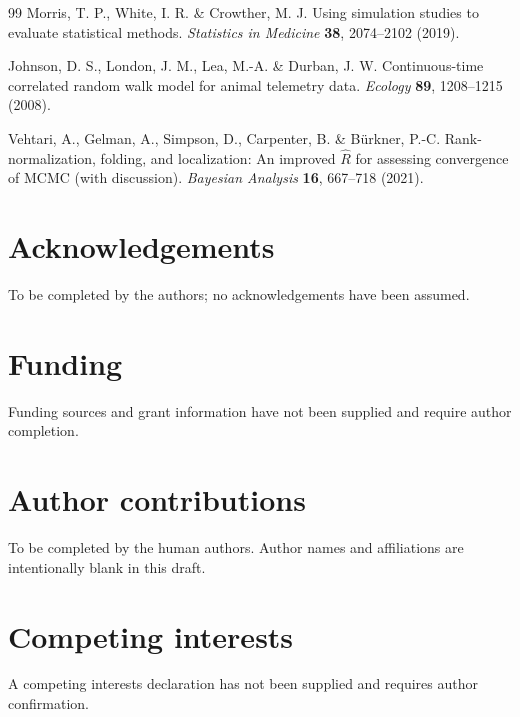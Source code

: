 \documentclass[12pt]{article}
\begin{document}
\begin{thebibliography}{99}
Morris, T. P., White, I. R. \& Crowther, M. J. Using simulation studies to
evaluate statistical methods. \textit{Statistics in Medicine}
\textbf{38}, 2074--2102 (2019).

Johnson, D. S., London, J. M., Lea, M.-A. \& Durban, J. W.
Continuous-time correlated random walk model for animal telemetry data.
\textit{Ecology} \textbf{89}, 1208--1215 (2008).

Vehtari, A., Gelman, A., Simpson, D., Carpenter, B. \& B{\"u}rkner, P.-C.
Rank-normalization, folding, and localization: An improved $\widehat{R}$ for
assessing convergence of MCMC (with discussion).
\textit{Bayesian Analysis} \textbf{16}, 667--718 (2021).
\end{thebibliography}

\section*{Acknowledgements}
To be completed by the authors; no acknowledgements have been assumed.
\section*{Funding}
Funding sources and grant information have not been supplied and require author completion.
\section*{Author contributions}
To be completed by the human authors. Author names and affiliations are intentionally blank in this draft.
\section*{Competing interests}
A competing interests declaration has not been supplied and requires author confirmation.

\clearpage
\end{document}
